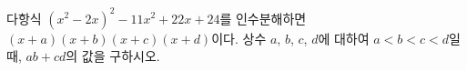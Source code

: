 다항식 $(x^2-2x)^2-11x^2+22x+24$를 인수분해하면 $(x+a)(x+b)(x+c)(x+d)$이다. 상수 $a$, $b$, $c$, $d$에 대하여 $a<b<c<d$일 때, $ab+cd$의 값을 구하시오.
